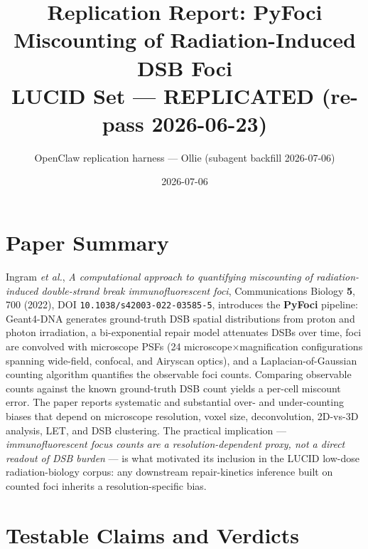 \documentclass[11pt]{article}
\title{Replication Report: PyFoci Miscounting of Radiation-Induced DSB Foci\\
       \large LUCID Set --- REPLICATED (re-pass 2026-06-23)}
\author{OpenClaw replication harness --- Ollie (subagent backfill 2026-07-06)}
\date{2026-07-06}
\begin{document}
\maketitle

\section{Paper Summary}

Ingram \emph{et al.}, \emph{A computational approach to quantifying miscounting of
radiation-induced double-strand break immunofluorescent foci}, Communications
Biology \textbf{5}, 700 (2022), DOI \texttt{10.1038/s42003-022-03585-5}, introduces
the \textbf{PyFoci} pipeline: Geant4-DNA generates ground-truth DSB spatial
distributions from proton and photon irradiation, a bi-exponential repair model
attenuates DSBs over time, foci are convolved with microscope PSFs (24
microscope$\times$magnification configurations spanning wide-field, confocal, and
Airyscan optics), and a Laplacian-of-Gaussian counting algorithm quantifies the
observable foci counts. Comparing observable counts against the known ground-truth
DSB count yields a per-cell miscount error. The paper reports systematic and
substantial over- and under-counting biases that depend on microscope resolution,
voxel size, deconvolution, 2D-vs-3D analysis, LET, and DSB clustering. The
practical implication --- \emph{immunofluorescent focus counts are a
resolution-dependent proxy, not a direct readout of DSB burden} --- is what
motivated its inclusion in the LUCID low-dose radiation-biology corpus: any
downstream repair-kinetics inference built on counted foci inherits a
resolution-specific bias.

\section{Testable Claims and Verdicts}
\end{document}
